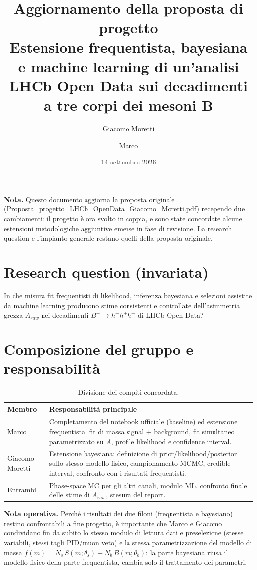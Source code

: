\documentclass[11pt,a4paper]{article}
\title{\color{accent}\textbf{Aggiornamento della proposta di progetto}\\[0.3em]
\Large Estensione frequentista, bayesiana e machine learning di un'analisi LHCb Open Data sui decadimenti a tre corpi dei mesoni B}
\author{Giacomo Moretti \and Marco}
\date{14 settembre 2026}
\begin{document}
\maketitle

\noindent\textbf{Nota.} Questo documento aggiorna la proposta originale (\url{Proposta_progetto_LHCb_OpenData_Giacomo_Moretti.pdf}) recependo due cambiamenti: il progetto è ora svolto in coppia, e sono state concordate alcune estensioni metodologiche aggiuntive emerse in fase di revisione. La research question e l'impianto generale restano quelli della proposta originale.

\section{Research question (invariata)}
In che misura fit frequentisti di likelihood, inferenza bayesiana e selezioni assistite da machine learning producono stime consistenti e controllate dell'asimmetria grezza $A_{raw}$ nei decadimenti $B^{\pm} \to h^{\pm} h^{+} h^{-}$ di LHCb Open Data?

\section{Composizione del gruppo e responsabilità}

\begin{table}[h!]
\centering
\begin{tabular}{L{3.5cm} L{10cm}}
\toprule
\textbf{Membro} & \textbf{Responsabilità principale} \\
\midrule
Marco & Completamento del notebook ufficiale (baseline) ed estensione frequentista: fit di massa signal + background, fit simultaneo parametrizzato su $A$, profile likelihood e confidence interval. \\
\addlinespace
Giacomo Moretti & Estensione bayesiana: definizione di prior/likelihood/posterior sullo stesso modello fisico, campionamento MCMC, credible interval, confronto con i risultati frequentisti. \\
\addlinespace
Entrambi & Phase-space MC per gli altri canali, modulo ML, confronto finale delle stime di $A_{raw}$, stesura del report. \\
\bottomrule
\end{tabular}
\caption{Divisione dei compiti concordata.}
\end{table}

\noindent\textbf{Nota operativa.} Perch\'e i risultati dei due filoni (frequentista e bayesiano) restino confrontabili a fine progetto, \`e importante che Marco e Giacomo condividano fin da subito lo stesso modulo di lettura dati e preselezione (stesse variabili, stessi tagli PID/muon veto) e la stessa parametrizzazione del modello di massa $f(m) = N_s\,S(m;\theta_s) + N_b\,B(m;\theta_b)$: la parte bayesiana riusa il modello fisico della parte frequentista, cambia solo il trattamento dei parametri.
\end{document}
